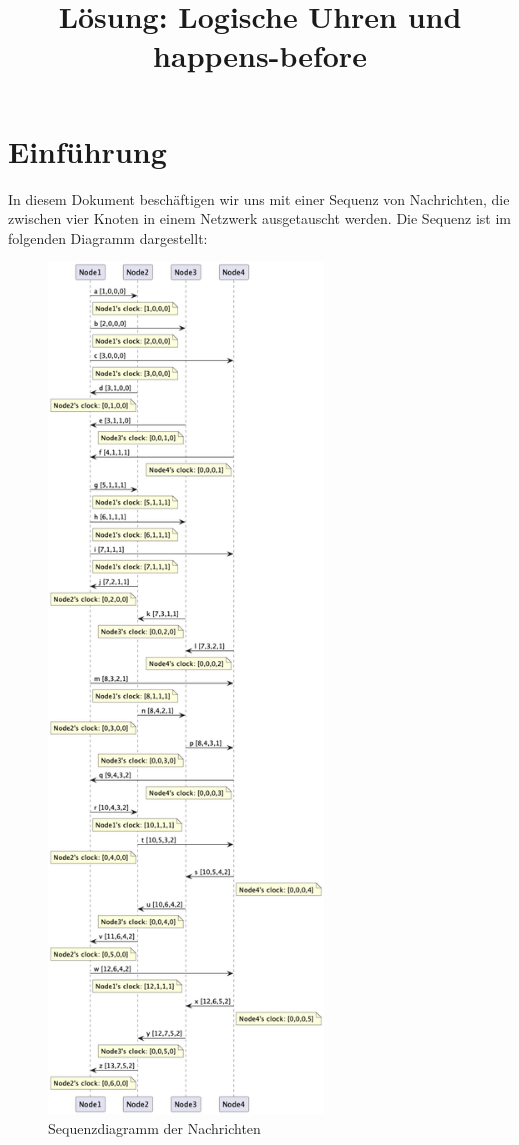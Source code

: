 \documentclass{article}
\begin{document}
\title{Lösung: Logische Uhren und happens-before}
\maketitle

\section{Einführung}
In diesem Dokument beschäftigen wir uns mit einer Sequenz von Nachrichten, die zwischen vier Knoten in einem Netzwerk ausgetauscht werden. Die Sequenz ist im folgenden Diagramm dargestellt:

\begin{figure}[h]
\centering
\includegraphics[width=0.65\textwidth]{../../fig/uml/clock_exam_concurrent.png}
\caption{Sequenzdiagramm der Nachrichten}
\label{fig:sequenzdiagramm}
\end{figure}
\end{document}
